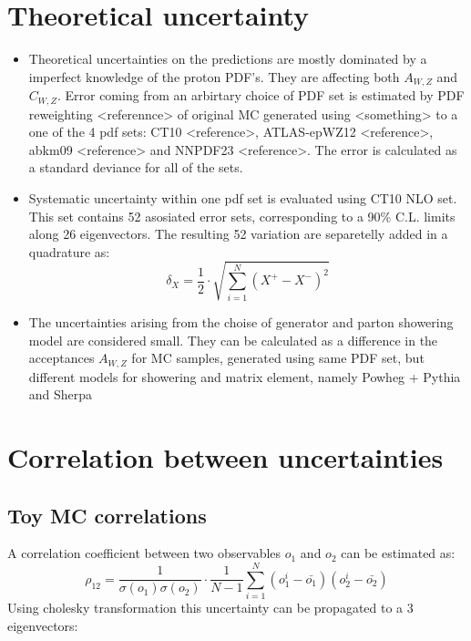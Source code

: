  

\section{Theoretical uncertainty}
\begin{itemize}

\item  Theoretical uncertainties on the predictions are mostly dominated by a imperfect knowledge of the proton PDF's. They are affecting both $A_{W,Z}$ and $C_{W,Z}$. 
Error coming from an arbirtary choice of PDF set is estimated by PDF reweighting <referennce> of original MC generated using <something> to a one of the 4 pdf sets: CT10 <reference>, ATLAS-epWZ12 <reference>, abkm09 <reference> and NNPDF23 <reference>. The error is calculated as a standard deviance for all of the sets.
\item Systematic uncertainty within one pdf set is evaluated using CT10 NLO set. This set contains 52 asosiated error sets, corresponding to a 90\% C.L. limits along 26 eigenvectors. The resulting 52 variation are separetelly added in a quadrature as:
\begin{equation}
\delta_X=\frac{1}{2}\cdot \sqrt{\sum_{i=1}^{N}(X^+-X^-)^2}
\end{equation}
\item The uncertainties arising from the choise of generator and parton showering model are considered small. They can be calculated as a difference in the acceptances  $A_{W,Z}$ for MC samples, generated using same PDF set, but different models for showering and matrix element, namely Powheg + Pythia and Sherpa
\end{itemize}
\section{Correlation between uncertainties}\label{sec:Cor}
\subsection{Toy MC correlations}
A correlation coefficient between two observables $o_1$ and $o_2$ can be estimated as:
\begin{equation}
\rho_{12}=\frac{1}{\sigma(o_1)\sigma(o_2)}\cdot \frac{1}{N-1} \sum_{i=1}^N (o^i_1-\bar{o_1}) (o^i_2-\bar{o_2})
\end{equation}
Using cholesky transformation this uncertainty can be propagated to a 3 eigenvectors:


